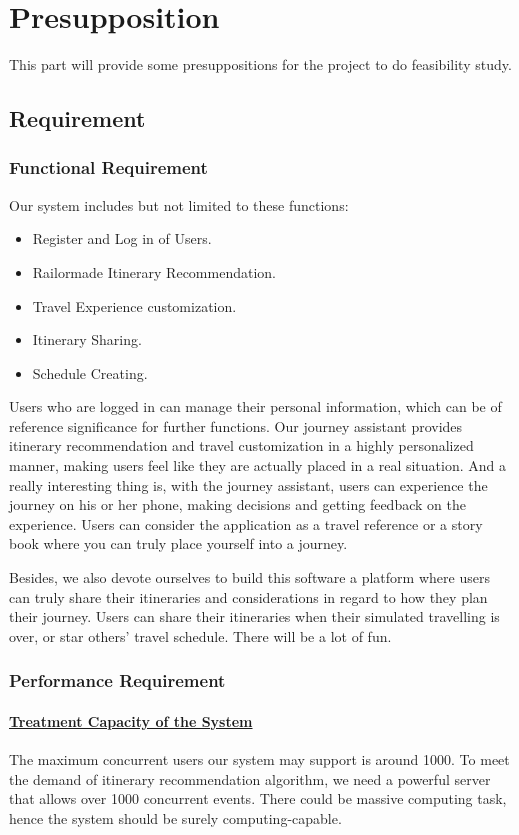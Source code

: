 \documentclass[10pt]{article}
\begin{document}
\section{Presupposition}
This part will provide some presuppositions for the project to do feasibility study.

\subsection{Requirement}
\subsubsection{Functional Requirement}
Our system includes but not limited to these functions: 

\begin{itemize}
  \item Register and Log in of Users.
  \item Railormade Itinerary Recommendation.
  \item Travel Experience customization.
  \item Itinerary Sharing.
  \item Schedule Creating.
\end{itemize}

Users who are logged in can manage their personal information, which can be of reference significance for further functions. Our journey assistant provides itinerary recommendation and travel customization in a highly personalized manner, making users feel like they are actually placed in a real situation. And a really interesting thing is, with the journey assistant, users can experience the journey on his or her phone, making decisions and getting feedback on the experience. Users can consider the application as a travel reference or a story book where you can truly place yourself into a journey. 

Besides, we also devote ourselves to build this software a platform where users can truly share their itineraries and considerations in regard to how they plan their journey. Users can share their itineraries when their simulated travelling is over, or star others' travel schedule. There will be a lot of fun.

\subsubsection{Performance Requirement}
\paragraph{\underline{Treatment Capacity of the System}} The maximum concurrent users our system may support is around 1000. To meet the demand of itinerary recommendation algorithm, we need a powerful server that allows over 1000 concurrent events. There could be massive computing task, hence the system should be surely computing-capable.
\end{document}
